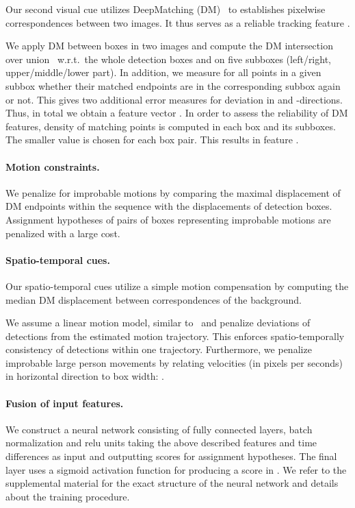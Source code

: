 \documentclass{article}
\begin{document}
Our second visual cue utilizes DeepMatching (DM)~\cite{weinzaepfel:hal-00873592} to establishes pixelwise correspondences between two images. It thus serves as a reliable tracking feature \cite{tang2016multi,Henschel_2018_CVPR_Workshops,henschel2019multiple}.


We apply DM between boxes in two images and compute the DM intersection over union~\cite{tang2016multi,Henschel_2018_CVPR_Workshops}  w.r.t.\ the whole detection boxes and on five subboxes (left/right, upper/middle/lower part).
In addition,  we measure for all points in a given subbox whether their matched endpoints are in the corresponding subbox again or not. This gives two additional error measures for deviation in  and -directions.
Thus, in total we obtain a feature vector .
In order to assess the reliability of DM features, density of matching points is computed in each box and its subboxes. The smaller value is chosen for each box pair. This results in feature .



\paragraph{Motion constraints.}
We penalize for improbable motions by comparing the maximal displacement of DM endpoints within the sequence with the displacements of detection boxes. Assignment hypotheses of pairs of boxes representing improbable motions are penalized with a large cost.



\paragraph{Spatio-temporal cues.}
Our spatio-temporal cues utilize a simple motion compensation by computing the median DM displacement between correspondences of the background. 

We assume a linear motion model, similar to~\cite{ristani2018features} and penalize deviations of detections from the estimated motion trajectory.
This enforces  spatio-temporally consistency of detections within one trajectory.
Furthermore, we penalize improbable large person movements by relating velocities (in pixels per seconds) in horizontal direction to box width:  .




\paragraph{Fusion of input features.}
We construct a neural network consisting of fully connected layers, batch normalization and relu units taking the above described features and time differences as input and outputting scores for assignment hypotheses.
The final layer uses a sigmoid activation function for producing a score in .
We refer to the supplemental material for the exact structure of the neural network and details about the training procedure. 
\end{document}
